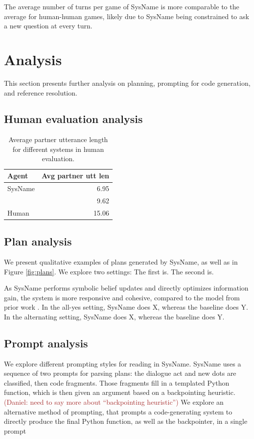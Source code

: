 \documentclass[11pt]{article}
\newcommand{\system}{SysName}
\newcommand{\daniel}[1]{{{\textcolor{brown}{(Daniel: #1)}}}}
\begin{document}
The average number of turns per game of \system{} is more comparable 
to the average for human-human games, likely due to \system{}
being constrained to ask a new question at every turn.

\section{Analysis}
This section presents further analysis on planning, prompting for code generation, and reference resolution.

\subsection{Human evaluation analysis}

\begin{table}[!t]
\centering
\begin{tabular}{lr}
\toprule
Agent                    & Avg partner utt len\\
\midrule
\system{}                &  6.95 \\
\citet{fried}            & 9.62  \\
Human                    & 15.06  \\
\bottomrule
\end{tabular}
\caption{\label{tbl:refres}
Average partner utterance length for different systems in human evaluation.
}\end{table}




\subsection{Plan analysis}
We present qualitative examples of plans generated by \system{}, as well as \citet{fried} in Figure \ref{fig:plans}.
We explore two settings: The first is.
The second is.

As \system{} performs symbolic belief updates and directly optimizes information gain,
the system is more responsive and cohesive, compared to the model from prior work \citep{fried}.
In the all-yes setting, \system{} does X, whereas the baseline does Y.
In the alternating setting, \system{} does X, whereas the baseline does Y.

\subsection{Prompt analysis}
We explore different prompting styles for reading in \system{}.
\system{} uses a sequence of two prompts for parsing plans:
the dialogue act and new dots are classified,
then code fragments.
Those fragments fill in a templated Python function,
which is then given an argument based on a backpointing heuristic.
\daniel{need to say more about ``backpointing heuristic''}
We explore an alternative method of prompting, that prompts
a code-generating system to directly produce the final Python function,
as well as the backpointer, in a single prompt
\end{document}
